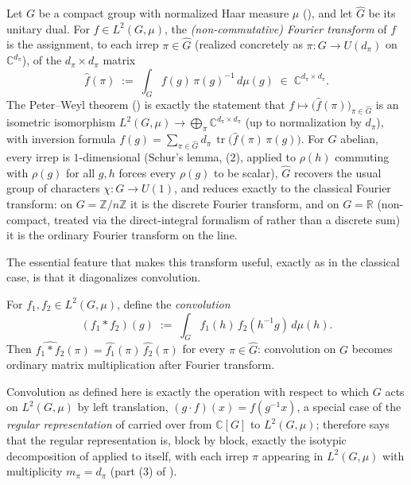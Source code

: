 \documentclass[mathematics,review,submit,moreauthors]{Definitions/mdpi}
\begin{document}
\begin{Definition}
\label{def:group-fourier-transform}
Let $G$ be a compact group with normalized Haar measure $\mu$
(), and let $\widehat{G}$ be its
unitary dual. For $f \in L^2(G,\mu)$, the \emph{(non-commutative) Fourier
transform} of $f$ is the assignment, to each irrep $\pi \in \widehat{G}$
(realized concretely as $\pi : G \to U(d_\pi)$ on $\mathbb{C}^{d_\pi}$), of
the $d_\pi \times d_\pi$ matrix
\[
    \widehat{f}(\pi) \;:=\; \int_G f(g)\, \pi(g)^{-1} \, d\mu(g) \;\in\; \mathbb{C}^{d_\pi \times d_\pi}.
\]
The Peter--Weyl theorem () is exactly the
statement that $f \mapsto \big(\widehat{f}(\pi)\big)_{\pi \in \widehat{G}}$
is an isometric isomorphism $L^2(G,\mu) \to \bigoplus_\pi \mathbb{C}^{d_\pi
\times d_\pi}$ (up to normalization by $d_\pi$), with inversion formula
$f(g) = \sum_{\pi \in \widehat{G}} d_\pi \,\operatorname{tr}\bigl(\widehat{f}(\pi)\,\pi(g)\bigr)$.
For $G$ abelian, every irrep is $1$-dimensional (Schur's lemma,
(2), applied to $\rho(h)$ commuting with $\rho(g)$ for
all $g,h$ forces every $\rho(g)$ to be scalar), $\widehat{G}$ recovers the
usual group of characters $\chi : G \to U(1)$, and
 reduces exactly to the
classical Fourier transform: on $G = \mathbb{Z}/n\mathbb{Z}$ it is the
discrete Fourier transform, and on $G = \mathbb{R}$ (non-compact, treated
via the direct-integral formalism of
 rather than a discrete sum) it
is the ordinary Fourier transform on the line.
\end{Definition}

The essential feature that makes this transform useful, exactly as in the
classical case, is that it diagonalizes convolution.

\begin{Proposition}
\label{prop:convolution-theorem}
For $f_1, f_2 \in L^2(G,\mu)$, define the \emph{convolution}
\[
    (f_1 * f_2)(g) \;:=\; \int_G f_1(h)\, f_2(h^{-1}g)\, d\mu(h).
\]
Then $\widehat{f_1 * f_2}(\pi) = \widehat{f_1}(\pi)\, \widehat{f_2}(\pi)$ for
every $\pi \in \widehat{G}$: convolution on $G$ becomes ordinary matrix
multiplication after Fourier transform.
\end{Proposition}

Convolution as defined here is exactly the operation with respect to which
$G$ acts on $L^2(G,\mu)$ by left translation, $(g \cdot f)(x) = f(g^{-1}x)$,
a special case of the \emph{regular representation} of
 carried over from $\mathbb{C}[G]$ to
$L^2(G,\mu)$;  therefore says that
the regular representation is, block by block, exactly the isotypic
decomposition of  applied to itself,
with each irrep $\pi$ appearing in $L^2(G,\mu)$ with multiplicity
$m_\pi = d_\pi$ (part (3) of ).
\end{document}

